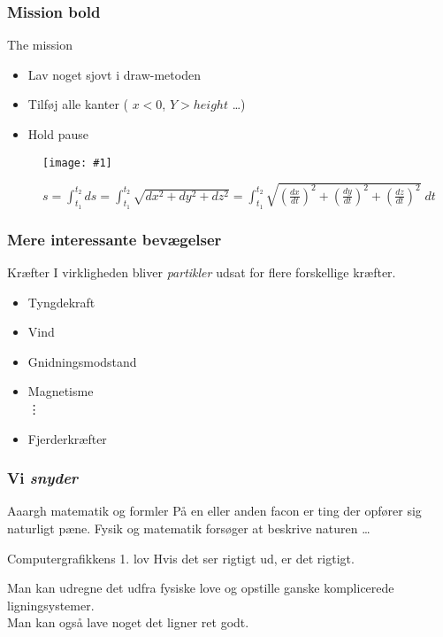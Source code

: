 \documentclass{beamer}
\newcommand{\FIGMED}[2]{
  \begin{figure}[]
    \centering
    \texttt{[image: \#1]}
    \caption{#2}
    \label{fig:#1}
  \end{figure}
}
\begin{document}
\begin{frame}
  \frametitle{Mission bold }

  \begin{block}{The mission}
    \begin{itemize}
    \item Lav noget sjovt i draw-metoden
    \item Tilføj alle kanter ( $x < 0$, $Y>height$ \ldots)
    \item Hold pause
    \end{itemize}
  \end{block}
\end{frame}


\begin{frame}[plain]

  \FIGMED{curve}{$s =  \int_{t_1}^{t_2} ds =\int_{t_1}^{t_2} \sqrt{dx^2 + dy^2 + dz^2} = \int_{t_1}^{t_2} \sqrt{\left(\frac{dx}{dt}\right)^2 + \left(\frac{dy}{dt}\right)^2 + \left(\frac{dz}{dt}\right)^2}\; dt$}
  
\end{frame}

\begin{frame}
  \frametitle{Mere interessante bevægelser}

  \begin{block}{Kræfter}
    I virkligheden bliver \emph{partikler} udsat for flere forskellige kræfter.
    \begin{itemize}
    \item Tyngdekraft
    \item Vind
    \item Gnidningsmodstand
    \item Magnetisme\\
      \hspace{.3cm}       \vdots
    \item Fjerderkræfter

    \end{itemize}
  \end{block}

\end{frame}


\begin{frame}
  \frametitle{Vi \emph{snyder}}


  \begin{block}{Aaargh matematik og formler}
    På en eller anden facon er ting der opfører sig naturligt pæne. Fysik og matematik forsøger at beskrive naturen \ldots
  \end{block}


  \begin{block}{Computergrafikkens 1. lov}
    Hvis det ser rigtigt ud, er det rigtigt.
  \end{block}



  Man kan udregne det udfra fysiske love og opstille ganske
  komplicerede ligningsystemer. \\
  Man kan også lave noget det ligner ret godt.

  

\end{frame}
\end{document}
